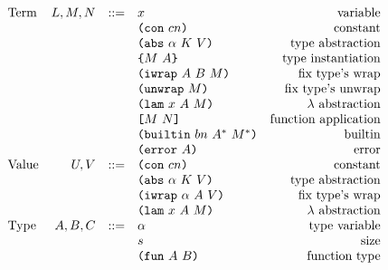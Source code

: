 \documentclass[../plutus-core-specification.tex]{subfiles}
\begin{document}
\begin{minipage}{\linewidth}
    \centering
    \[\begin{array}{lrclr}
        \textrm{Term}             & L,M,N  & ::= & x                          & \textrm{variable}\\
                                  &        &     & \texttt{(} \texttt{con} ~ cn \texttt{)}                   & \textrm{constant}\\
                                  &        &     & \texttt{(} \texttt{abs} ~ \alpha ~ K ~ V \texttt{)}         & \textrm{type abstraction}\\
                                  &        &     & \texttt{\{}M ~ A\texttt{\}}                & \textrm{type instantiation}\\
                                  &        &     & \texttt{(} \texttt{iwrap} ~ A ~ B ~ M \texttt{)}             & \textrm{fix type's wrap}\\
                                  &        &     & \texttt{(} \texttt{unwrap} ~ M \texttt{)}                 & \textrm{fix type's unwrap}\\
                                  &        &     & \texttt{(} \texttt{lam} ~ x ~ A ~ M \texttt{)}              & \textrm{$\lambda$ abstraction}\\
                                  &        &     & \texttt{[} M ~ N \texttt{]}                 & \textrm{function application}\\
                                  &        &     & \texttt{(} \texttt{builtin} ~ bn ~ A^* ~ M^* \texttt{)}     & \textrm{builtin}\\
                                  &        &     & \texttt{(} \texttt{error} ~ A \texttt{)}                  & \textrm{error}\\
        \textrm{Value}            & U, V   & ::= & \texttt{(} \texttt{con} ~ cn \texttt{)}                   & \textrm{constant}\\
                                  &        &     & \texttt{(} \texttt{abs} ~ \alpha ~ K ~ V \texttt{)}         & \textrm{type abstraction}\\
                                  &        &     & \texttt{(} \texttt{iwrap} ~ \alpha ~ A ~ V \texttt{)}        & \textrm{fix type's wrap}\\
                                  &        &     & \texttt{(} \texttt{lam} ~ x ~ A ~ M \texttt{)}              & \textrm{$\lambda$ abstraction}\\
        \textrm{Type}             & A,B,C  & ::= & \alpha                     & \textrm{type variable}\\
                                  &        &     & s                          & \textrm{size}\\
                                  &        &     & \texttt{(} \texttt{fun} ~ A ~ B \texttt{)}                & \textrm{function type}\\

\end{array}\]
\end{minipage}
\end{document}
